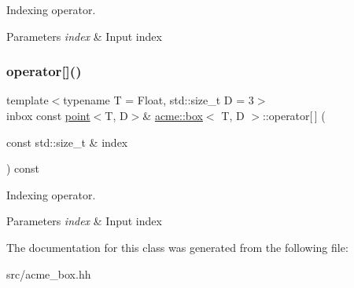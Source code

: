 Indexing operator. 


\begin{DoxyParams}{Parameters}
{\em index} & Input index \\
\hline
\end{DoxyParams}
\mbox{\label{classacme_1_1box_a150ce3619323c45d342f0ea4443faa1b}} 
\subsubsection{\texorpdfstring{operator[]()}{operator[]()}\hspace{0.1cm}{\footnotesize\ttfamily [2/2]}}
{\footnotesize\ttfamily template$<$typename T = Float, std\+::size\+\_\+t D = 3$>$ \\
inbox const \hyperlink{classacme_1_1point}{point}$<$T, D$>$\& \hyperlink{classacme_1_1box}{acme\+::box}$<$ T, D $>$\+::operator\mbox{[}$\,$\mbox{]} (\begin{DoxyParamCaption}\item[{const std\+::size\+\_\+t \&}]{index }\end{DoxyParamCaption}) const\hspace{0.3cm}{\ttfamily [inline]}}



Indexing operator. 


\begin{DoxyParams}{Parameters}
{\em index} & Input index \\
\hline
\end{DoxyParams}


The documentation for this class was generated from the following file\+:\begin{DoxyCompactItemize}
\item 
src/acme\+\_\+box.\+hh\end{DoxyCompactItemize}
